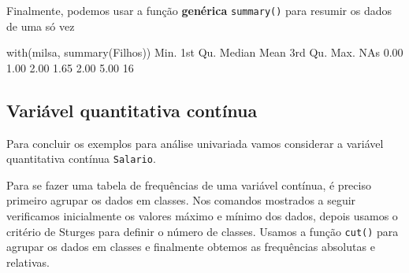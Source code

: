 \documentclass[
  10pt,
  a4paper]{book}
\newenvironment{Shaded}{\begin{snugshade}}{\end{snugshade}}
\newcommand{\FunctionTok}[1]{\textcolor[rgb]{0.00,0.00,0.00}{#1}}
\newcommand{\NormalTok}[1]{#1}
\newcommand{\StringTok}[1]{\textcolor[rgb]{0.31,0.60,0.02}{#1}}
\begin{document}
Finalmente, podemos usar a função \textbf{genérica} \texttt{summary()} para resumir
os dados de uma só vez

\begin{Shaded}
\begin{Highlighting}[]
\FunctionTok{with}\NormalTok{(milsa, }\FunctionTok{summary}\NormalTok{(Filhos))}
\NormalTok{   Min. 1st Qu.  Median    Mean 3rd Qu.    Max.    NA}\StringTok{\textquotesingle{}s }
\StringTok{   0.00    1.00    2.00    1.65    2.00    5.00      16 }
\end{Highlighting}
\end{Shaded}

\hypertarget{variuxe1vel-quantitativa-contuxednua}{%
\subsection{Variável quantitativa contínua}\label{variuxe1vel-quantitativa-contuxednua}}

Para concluir os exemplos para análise univariada vamos considerar a
variável quantitativa contínua \texttt{Salario}.

Para se fazer uma tabela de frequências de uma variável contínua, é preciso
primeiro agrupar os dados em classes. Nos comandos mostrados a seguir
verificamos inicialmente os valores máximo e mínimo dos dados, depois
usamos o critério de Sturges para definir o número de classes. Usamos
a função \texttt{cut()} para agrupar os dados em classes e finalmente obtemos
as frequências absolutas e relativas.
\end{document}
